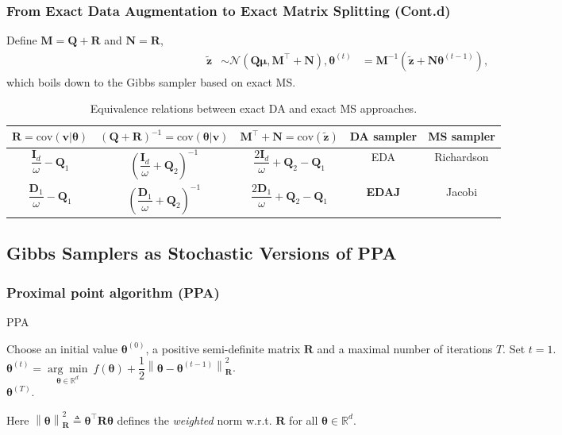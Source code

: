 \documentclass[aspectratio=169]{beamer}
\newcommand{\B}[1]{\mathbf{#1}} %
\newcommand{\Bs}[1]{\boldsymbol{#1}} %
\newcommand{\pr}[1]{\left(#1\right)} %
\newcommand{\nr}[1]{\left\|#1\right\|} %
\begin{document}
\begin{frame}
  \frametitle{From Exact Data Augmentation to Exact Matrix Splitting (Cont.d)}
  Define $\B{M} = \B{Q}+\B{R}$ and $\B{N} = \B{R}$, 
  \[
    \begin{aligned}
      \tilde{\B{z}} & \sim  \mathcal{N}\pr{\B{Q}\Bs{\mu}, \B{M}^{\top} + \B{N}},
      \Bs{\theta}^{(t)} & =  \B{M}^{-1}\pr{\tilde{\B{z}} + \B{N}\Bs{\theta}^{(t-1)}},
    \end{aligned} 
    \]
  which boils down to the Gibbs sampler based on exact MS.
  
\begin{table}
{\footnotesize
  \caption{Equivalence relations between exact DA and exact MS approaches.} 
  \begin{center}
    {\renewcommand{\arraystretch}{1.5}
    \begin{tabular}{|c|c|c|c|c|} 
      \hline
      $\B{R}=\text{cov}(\B{v}|\Bs{\theta})$ 
      & $(\B{Q} + \B{R})^{-1}=\text{cov}(\Bs{\theta}|\B{v})$ 
      & $\B{M}^{\top} + \B{N}=\text{cov}(\tilde{\B{z}})$ 
      & DA sampler & MS sampler \\
      \hline 
      $\dfrac{\B{I}_d}{\omega} - \B{Q}_1$ 
      & $\pr{\dfrac{\B{I}_d}{\omega} + \B{Q}_2}^{-1}$ 
      & $\dfrac{2\B{I}_d}{\omega} + \B{Q}_2 - \B{Q}_1$ 
      & EDA& Richardson  \\
      $\dfrac{\B{D}_1}{\omega} - \B{Q}_1$ 
      & $\pr{\dfrac{\B{D}_1}{\omega} + \B{Q}_2}^{-1}$ 
      & $\dfrac{2\B{D}_1}{\omega} + \B{Q}_2 - \B{Q}_1$ 
      & {\bf EDAJ} & Jacobi\\[1em]
      \hline
    \end{tabular}}
  \end{center}
}
\end{table}
\end{frame}

\subsection{Gibbs Samplers as Stochastic Versions of PPA}
\begin{frame}
\frametitle{Proximal point algorithm (PPA)}
\begin{algorithm}[H]
\caption{PPA}
\begin{algorithmic}[1]
\State Choose an initial value $\Bs{\theta}^{(0)}$, a positive semi-definite matrix $\B{R}$ and a maximal number of iterations $T$.
\State Set $t=1$.
\State $\Bs{\theta}^{(t)} = \underset{\Bs{\theta}\in\mathbb{R}^d}{\arg \min}\ f(\Bs{\theta}) + \dfrac{1}{2}\nr{\Bs{\theta}-\Bs{\theta}^{(t-1)}}_{\B{R}}^2$.
\EndWhile\\
\Return $\Bs{\theta}^{(T)}$.
\end{algorithmic}
\end{algorithm}
Here \(\nr{\Bs{\theta}}_{\B{R}}^2 \triangleq {\Bs{\theta}^{\top}\B{R}\Bs{\theta}}\) defines the \textit{weighted} norm w.r.t. $\B{R}$ for all $\Bs{\theta} \in \mathbb{R}^d$.

\end{frame}
\end{document}
